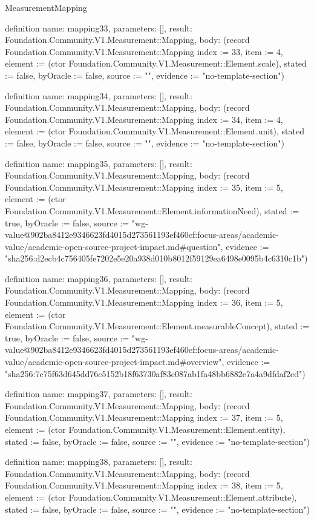 \begin{lexlean}{MeasurementMapping}
\begin{semanticmodule}
definition{
  name: mapping33,
  parameters: [],
  result: Foundation.Community.V1.Measurement::Mapping,
  body: (record Foundation.Community.V1.Measurement::Mapping {index := 33, item := 4, element := (ctor Foundation.Community.V1.Measurement::Element.scale), stated := false, byOracle := false, source := "", evidence := "no-template-section"})
}

definition{
  name: mapping34,
  parameters: [],
  result: Foundation.Community.V1.Measurement::Mapping,
  body: (record Foundation.Community.V1.Measurement::Mapping {index := 34, item := 4, element := (ctor Foundation.Community.V1.Measurement::Element.unit), stated := false, byOracle := false, source := "", evidence := "no-template-section"})
}

definition{
  name: mapping35,
  parameters: [],
  result: Foundation.Community.V1.Measurement::Mapping,
  body: (record Foundation.Community.V1.Measurement::Mapping {index := 35, item := 5, element := (ctor Foundation.Community.V1.Measurement::Element.informationNeed), stated := true, byOracle := false, source := "wg-value@902ba8412e9346623fd4015d273561193ef460cf:focus-areas/academic-value/academic-open-source-project-impact.md#question", evidence := "sha256:d2ecb4c756405fe7202e5e20a938d010b8012f59129ea6498e0095b4c6310c1b"})
}

definition{
  name: mapping36,
  parameters: [],
  result: Foundation.Community.V1.Measurement::Mapping,
  body: (record Foundation.Community.V1.Measurement::Mapping {index := 36, item := 5, element := (ctor Foundation.Community.V1.Measurement::Element.measurableConcept), stated := true, byOracle := false, source := "wg-value@902ba8412e9346623fd4015d273561193ef460cf:focus-areas/academic-value/academic-open-source-project-impact.md#overview", evidence := "sha256:7c75f63d645dd76c5152b18f63730af83c087ab1fa48bb6882e7a4a9dfdaf2ed"})
}

definition{
  name: mapping37,
  parameters: [],
  result: Foundation.Community.V1.Measurement::Mapping,
  body: (record Foundation.Community.V1.Measurement::Mapping {index := 37, item := 5, element := (ctor Foundation.Community.V1.Measurement::Element.entity), stated := false, byOracle := false, source := "", evidence := "no-template-section"})
}

definition{
  name: mapping38,
  parameters: [],
  result: Foundation.Community.V1.Measurement::Mapping,
  body: (record Foundation.Community.V1.Measurement::Mapping {index := 38, item := 5, element := (ctor Foundation.Community.V1.Measurement::Element.attribute), stated := false, byOracle := false, source := "", evidence := "no-template-section"})
}


\end{semanticmodule}
\end{lexlean}
